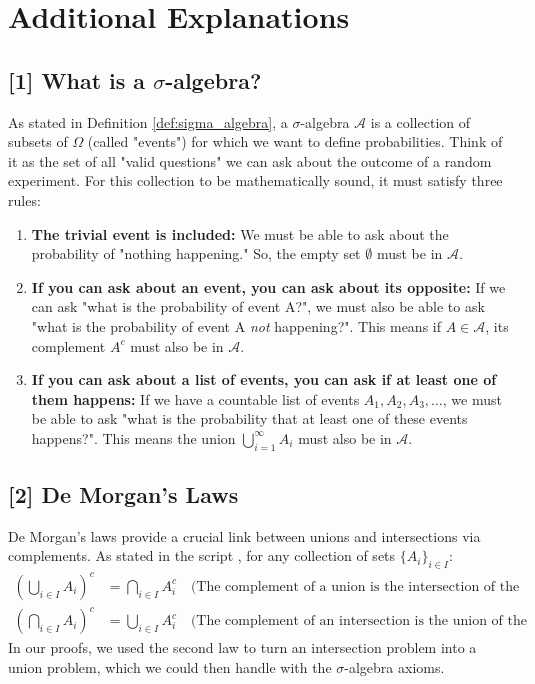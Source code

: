 \documentclass[11pt,a4paper]{article}
\theoremstyle{definition}
\begin{document}
\newpage
\section{Additional Explanations}

\subsection*{[1] What is a $\sigma$-algebra?}
\label{note:sigma_algebra_full}
As stated in Definition \ref{def:sigma_algebra}, a $\sigma$-algebra $\mathcal{A}$ is a collection of subsets of $\Omega$ (called "events") for which we want to define probabilities. Think of it as the set of all "valid questions" we can ask about the outcome of a random experiment. For this collection to be mathematically sound, it must satisfy three rules:
\begin{enumerate}
    \item \textbf{The trivial event is included:} We must be able to ask about the probability of "nothing happening." So, the empty set $\emptyset$ must be in $\mathcal{A}$.
    \item \textbf{If you can ask about an event, you can ask about its opposite:} If we can ask "what is the probability of event A?", we must also be able to ask "what is the probability of event A \textit{not} happening?". This means if $A \in \mathcal{A}$, its complement $A^c$ must also be in $\mathcal{A}$.
    \item \textbf{If you can ask about a list of events, you can ask if at least one of them happens:} If we have a countable list of events $A_1, A_2, A_3, \dots$, we must be able to ask "what is the probability that at least one of these events happens?". This means the union $\bigcup_{i=1}^{\infty} A_i$ must also be in $\mathcal{A}$.
\end{enumerate}

\subsection*{[2] De Morgan's Laws}
\label{note:demorgan}
De Morgan's laws provide a crucial link between unions and intersections via complements. As stated in the script \cite[Lemma 1.2]{script}, for any collection of sets $\{A_i\}_{i \in I}$:
\begin{align*}
    \left( \bigcup_{i \in I} A_i \right)^c &= \bigcap_{i \in I} A_i^c \quad \text{(The complement of a union is the intersection of the complements)} \\
    \left( \bigcap_{i \in I} A_i \right)^c &= \bigcup_{i \in I} A_i^c \quad \text{(The complement of an intersection is the union of the complements)}
\end{align*}
In our proofs, we used the second law to turn an intersection problem into a union problem, which we could then handle with the $\sigma$-algebra axioms.
\end{document}
